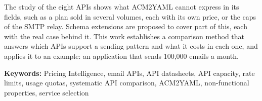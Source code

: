 The study of the eight APIs shows what ACM2YAML cannot express in its fields, such as a plan
sold in several volumes, each with its own price, or the caps of the SMTP relay. Schema
extensions are proposed to cover part of this, each with the real case behind it. This work
establishes a comparison method that answers which APIs support a sending pattern and what it
costs in each one, and applies it to an example: an application that sends 100,000 emails
a month.

\vspace{.5cm}
\noindent\textbf{Keywords:} Pricing Intelligence, email APIs, API datasheets, API capacity, rate limits, usage quotas, systematic API comparison, ACM2YAML, non-functional properties, service selection
